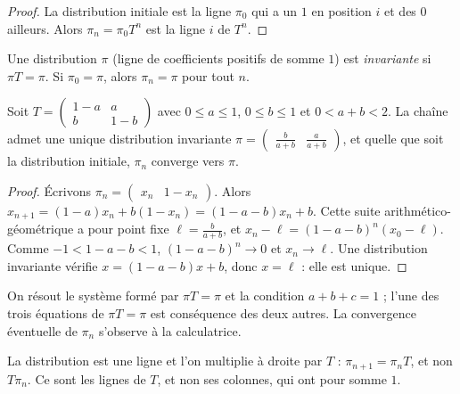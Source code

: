 \begin{proof}
La distribution initiale est la ligne $\pi_0$ qui a un $1$ en position $i$ et des $0$ ailleurs. Alors $\pi_n=\pi_0T^n$ est la ligne $i$ de $T^n$.
\end{proof}
\begin{definition}
Une distribution $\pi$ (ligne de coefficients positifs de somme $1$) est \emph{invariante} si $\pi T=\pi$. Si $\pi_0=\pi$, alors $\pi_n=\pi$ pour tout $n$.
\end{definition}
\begin{theorem}
Soit $T=\begin{pmatrix}1-a&a\\b&1-b\end{pmatrix}$ avec $0\le a\le1$, $0\le b\le1$ et $0<a+b<2$. La chaîne admet une unique distribution invariante $\pi=\begin{pmatrix}\frac b{a+b}&\frac a{a+b}\end{pmatrix}$, et quelle que soit la distribution initiale, $\pi_n$ converge vers $\pi$.
\end{theorem}
\begin{proof}
Écrivons $\pi_n=\begin{pmatrix}x_n&1-x_n\end{pmatrix}$. Alors $x_{n+1}=(1-a)x_n+b(1-x_n)=(1-a-b)x_n+b$. Cette suite arithmético-géométrique a pour point fixe $\ell=\frac b{a+b}$, et $x_n-\ell=(1-a-b)^n(x_0-\ell)$. Comme $-1<1-a-b<1$, $(1-a-b)^n\to0$ et $x_n\to\ell$. Une distribution invariante vérifie $x=(1-a-b)x+b$, donc $x=\ell$ : elle est unique.
\end{proof}
\begin{method}
On résout le système formé par $\pi T=\pi$ et la condition $a+b+c=1$ ; l'une des trois équations de $\pi T=\pi$ est conséquence des deux autres. La convergence éventuelle de $\pi_n$ s'observe à la calculatrice.
\end{method}
\begin{pitfall}
La distribution est une ligne et l'on multiplie à droite par $T$ : $\pi_{n+1}=\pi_nT$, et non $T\pi_n$. Ce sont les lignes de $T$, et non ses colonnes, qui ont pour somme $1$.
\end{pitfall}

\mxnewpage
